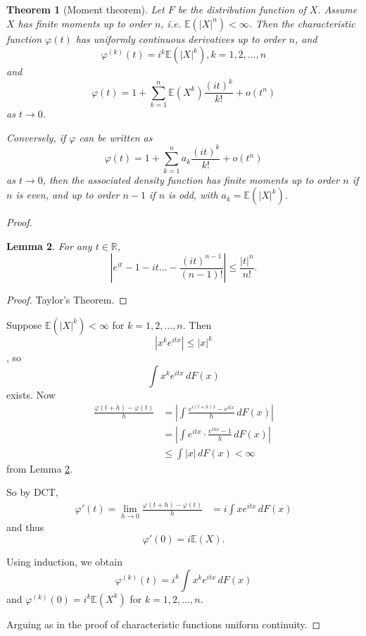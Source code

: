 \documentclass[10pt, oneside, reqno]{amsart}
\theoremstyle{plain}%
\newtheorem{thm}{Theorem}[section]
\newtheorem{lem}[thm]{Lemma}
\theoremstyle{definition}
\theoremstyle{remark}
\renewcommand{\phi}{\varphi}
\newcommand{\R}{\mathbb{R}}
\newcommand{\E}{\mathbb{E}}
\begin{document}
\begin{thm}[Moment theorem]
    Let $F$ be the distribution function of $X$.  Assume $X$ has finite moments up to order $n$, i.e. $\E(|X|^n) < \infty$.  Then the characteristic function $\phi(t)$ has uniformly continuous derivatives up to order $n$, and \[
        \phi^{(k)}(t) = i^k \E(|X|^k), k = 1, 2, \dots, n
    \] and \[
        \phi(t) = 1 + \sum_{k=1}^n \E(X^k) \frac{(it)^k}{k!} + o(t^n)
    \] as $t \rightarrow 0$. 
    
    Conversely, if $\phi$ can be written as \[
    \phi(t) = 1 + \sum_{k=1}^n a_k \frac{(it)^k}{k!} + o(t^n)
    \] as $t \rightarrow 0$, then the associated density function has finite moments up to order $n$ if $n$ is even, and up to order $n-1$ if $n$ is odd, with $a_k = \E(|X|^k)$.   
\end{thm}
\begin{proof}

\begin{lem}\label{lem:taylor}
    For any $t \in \R$, \[
        \left|  e^{it} - 1 - it \dots - \frac{(it)^{n-1}}{(n-1)!} \right| \leq \frac{|t|^n}{n!}.
    \]
\end{lem}
\begin{proof}
    Taylor's Theorem.
\end{proof}

Suppose $\E(|X|^k) < \infty$ for $k = 1, 2, \dots, n$.  Then \[
    |x^k e^{itx} | \leq |x|^k\], so \[
        \int x^k e^{itx} \, dF(x)
    \]  exists.  Now \begin{align*}
        \frac{\phi(t+h) - \phi(t)}{h} &= \left| \int \frac{e^{i(t+h)x} - e^{itx}}{h} \, dF(x) \right| \\
        &= \left| \int e^{itx} \cdot \frac{e^{ihx} - 1}{h} \, dF(x) \right| \\
        &\leq \int |x| \, dF(x) < \infty
    \end{align*} from Lemma \ref{lem:taylor}.
    
    So by DCT, \begin{align*}
        \phi'(t) = \lim_{h \rightarrow 0} \frac{\phi(t+h) - \phi(t)}{h} &= i \int x e^{itx}  \, dF(x)
    \end{align*} and thus \[
        \phi'(0) = i \E(X).
    \]

    Using induction, we obtain \[
        \phi^{(k)}(t) = i^k \int x^k e^{itx} \, dF(x)
    \] and $\phi^{(k)}(0) = i^k \E(X^k)$ for $k = 1, 2, \dots, n$. 
    
    Arguing as in the proof of characteristic functions uniform continuity.  
    

\end{proof}
\end{document}
